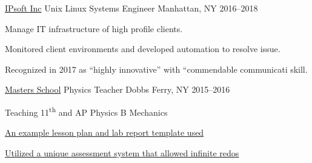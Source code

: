 


\begin{cventries}

\cventry
    {\href{www.ipsoft.com}{IPsoft Inc}}
    {Unix Linux Systems Engineer}
    {Manhattan, NY}
    {2016--2018}
    {
    \begin{cvitems}
        \item Manage IT infrastructure of high profile clients.
        \item Monitored client environments and developed automation to resolve issue.
        \item Recognized in 2017 as ``highly innovative'' with ``commendable communicati skill.
    \end{cvitems}
    }

\cventry
    {\href{mastersny.org}{Masters School}}
    {Physics Teacher}
    {Dobbs Ferry, NY} {2015--2016}
    {
    \begin{cvitems}
      \item {Teaching 11\textsuperscript{th} and AP Physics B Mechanics}
      \item {\href{https://github.com/jphafner/physicsReport}{An example lesson plan and lab report template used}}
      \item {\href{https://github.com/jphafner/physicsAMC}{Utilized a unique assessment system that allowed infinite redos}}
    \end{cvitems}
    }


\end{cventries}
